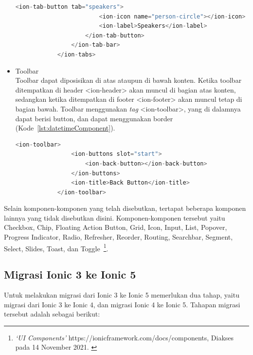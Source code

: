 \begin{itemize}
\begin{lstlisting}[language=php, label={lst:tabsComponent}, caption=Kode Program dari Tabs]
					<ion-tab-button tab="speakers">
						<ion-icon name="person-circle"></ion-icon>
						<ion-label>Speakers</ion-label>
					</ion-tab-button>
				</ion-tab-bar>
			</ion-tabs>
		\end{lstlisting}

	\item Toolbar \\
	Toolbar dapat diposisikan di atas ataupun di bawah konten. Ketika toolbar ditempatkan di header <ion-header> akan muncul di bagian atas konten, sedangkan ketika ditempatkan di footer <ion-footer> akan muncul tetap di bagian bawah. Toolbar menggunakan {\it tag} <ion-toolbar>, yang di dalamnya dapat berisi button, dan dapat menggunakan border (Kode~\ref{lst:datetimeComponent}).
		\begin{lstlisting}[language=php, label={lst:datetimeComponent}, caption=Kode Program dari Toolbar dengan Button di Dalamnya]
			<ion-toolbar>
				<ion-buttons slot="start">
					<ion-back-button></ion-back-button>
				</ion-buttons>
				<ion-title>Back Button</ion-title>
			</ion-toolbar>
		\end{lstlisting} 
\end{itemize}
	Selain komponen-komponen yang telah disebutkan, tertapat beberapa komponen lainnya yang tidak disebutkan disini. Komponen-komponen tersebut yaitu Checkbox, Chip, Floating Action Button, Grid, Icon, Input, List, Popover, Progress Indicator, Radio, Refresher, Reorder, Routing, Searchbar, Segment, Select, Slides, Toast, dan Toggle~\footnote{\textit{`UI Components'} https://ionicframework.com/docs/components, Diakses pada 14 November 2021. \label{ref:uiComponents}}.

\subsection{Migrasi Ionic 3 ke Ionic 5}
\label{subsec:migrasi}

Untuk melakukan migrasi dari Ionic 3 ke Ionic 5 memerlukan dua tahap, yaitu migrasi dari Ionic 3 ke Ionic 4, dan migrasi Ionic 4 ke Ionic 5. Tahapan migrasi tersebut adalah sebagai berikut:

